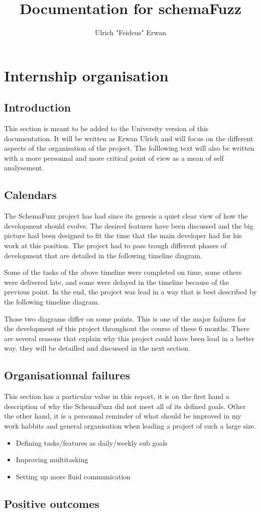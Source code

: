 \documentclass{article}
\title{Documentation for schemaFuzz}
\author{Ulrich "Feideus" Erwan}
\begin{document}
\section{Internship organisation}
	\subsection{Introduction}

This section is meant to be added to the University version of this documentation. It will be written as Erwan Ulrich and will focus on the different aspects of the organisation of the project. The folllowing text will also be written with a more personnal and more critical point of view as a mean of self analysement.

	\subsection{Calendars}
	
The	SchemaFuzz project has had since its genesis a quiet clear view of how the development should evolve. The desired features have been discussed and the big picture had been designed to fit the time that the main developer had for his work at this position.
The project had to pass trough different phases of development that are detailed in the following timeline diagram. %

Some of the tasks of the above timeline were completed on time, some others were delivered late, and some were delayed in the timeline because of the previous point.
In the end, the project was lead in a way that is best described by the following timeline diagram.    %

Those two diagrams differ on some points. This is one of the major failures for the development of this project throughout the course of these 6 months. 
There are several reasons that explain why this project could have been lead in a better way.
they will be detailled and discussed in the next section. 

	\subsection{Organisationnal failures}
This section has a particular value in this report, it is on the first hand a description of why the SchemaFuzz did not meet all of its defined goals.
Other the other hand, it is a personnal reminder of what should be improved in my work habbits and general organisation when leading a project of such a large size. 
	
	\begin{itemize}
	\item{Defining tasks/features as daily/weekly sub goals}
	\item{Improving multitasking} %
	\item{Setting up more fluid communication}
	\end{itemize}		

	\subsection{Positive outcomes}
\end{document}
